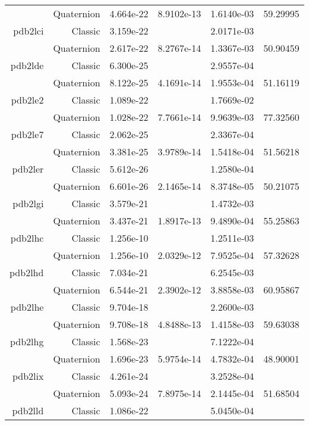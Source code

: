 \begin{xltabular}{\textwidth}{r|rS[table-format=1.3e+2]S[table-format=1.4e+2]S[table-format=1.4e+2]S[table-format=-1.5]}
& Quaternion & 4.664e-22 & 8.9102e-13 & 1.6140e-03 & 59.29995\\  \addlinespace
pdb2lci & Classic & 3.159e-22 &  & 2.0171e-03 & \\
& Quaternion & 2.617e-22 & 8.2767e-14 & 1.3367e-03 & 50.90459\\  \addlinespace
pdb2lde & Classic & 6.300e-25 &  & 2.9557e-04 & \\
& Quaternion & 8.122e-25 & 4.1691e-14 & 1.9553e-04 & 51.16119\\  \addlinespace
pdb2le2 & Classic & 1.089e-22 &  & 1.7669e-02 & \\
& Quaternion & 1.028e-22 & 7.7661e-14 & 9.9639e-03 & 77.32560\\  \addlinespace
pdb2le7 & Classic & 2.062e-25 &  & 2.3367e-04 & \\
& Quaternion & 3.381e-25 & 3.9789e-14 & 1.5418e-04 & 51.56218\\  \addlinespace
pdb2ler & Classic & 5.612e-26 &  & 1.2580e-04 & \\
& Quaternion & 6.601e-26 & 2.1465e-14 & 8.3748e-05 & 50.21075\\  \addlinespace
pdb2lgi & Classic & 3.579e-21 &  & 1.4732e-03 & \\
& Quaternion & 3.437e-21 & 1.8917e-13 & 9.4890e-04 & 55.25863\\  \addlinespace
pdb2lhc & Classic & 1.256e-10 &  & 1.2511e-03 & \\
& Quaternion & 1.256e-10 & 2.0329e-12 & 7.9525e-04 & 57.32628\\  \addlinespace
pdb2lhd & Classic & 7.034e-21 &  & 6.2545e-03 & \\
& Quaternion & 6.544e-21 & 2.3902e-12 & 3.8858e-03 & 60.95867\\  \addlinespace
pdb2lhe & Classic & 9.704e-18 &  & 2.2600e-03 & \\
& Quaternion & 9.708e-18 & 4.8488e-13 & 1.4158e-03 & 59.63038\\  \addlinespace
pdb2lhg & Classic & 1.568e-23 &  & 7.1222e-04 & \\
& Quaternion & 1.696e-23 & 5.9754e-14 & 4.7832e-04 & 48.90001\\  \addlinespace
pdb2lix & Classic & 4.261e-24 &  & 3.2528e-04 & \\
& Quaternion & 5.093e-24 & 7.8975e-14 & 2.1445e-04 & 51.68504\\  \addlinespace
pdb2lld & Classic & 1.086e-22 &  & 5.0450e-04 & \\

\end{xltabular}

